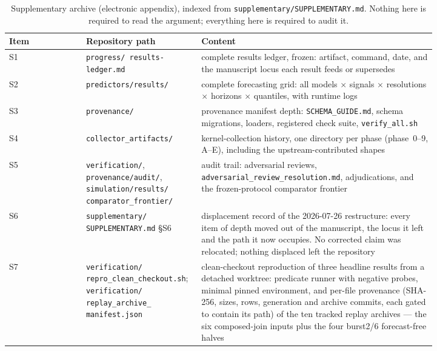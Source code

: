 \begin{table}[htbp]
\centering
\caption[Supplementary archive index]{Supplementary archive (electronic
appendix), indexed from \texttt{supplementary/SUPPLEMENTARY.md}. Nothing here
is required to read the argument; everything here is required to audit it.}
\label{tab:ap-supp}
\scriptsize
\setlength{\tabcolsep}{4pt}
\begin{tabular}{@{}l>{\raggedright\arraybackslash}p{0.27\linewidth}>{\raggedright\arraybackslash}p{0.55\linewidth}@{}}
\toprule
Item & Repository path & Content \\
\midrule
S1 & \texttt{progress/ results-ledger.md} & complete results ledger, frozen: artifact,
  command, date, and the manuscript locus each result feeds or supersedes \\
S2 & \texttt{predictors/results/} & complete forecasting grid: all models
  $\times$ signals $\times$ resolutions $\times$ horizons $\times$ quantiles,
  with runtime logs \\
S3 & \texttt{provenance/} & provenance manifest depth: \texttt{SCHEMA\_GUIDE.md},
  schema migrations, loaders, registered check suite, \texttt{verify\_all.sh} \\
S4 & \texttt{collector\_artifacts/} & kernel-collection history, one directory per
  phase (phase~0--9, A--E), including the upstream-contributed shapes \\
S5 & \texttt{verification/}, \texttt{provenance/audit/},
  \texttt{simulation/results/ comparator\_frontier/} & audit trail: adversarial
  reviews, \texttt{adversarial\_review\_resolution.md}, adjudications, and the
  frozen-protocol comparator frontier \\
S6 & \texttt{supplementary/ SUPPLEMENTARY.md} \S S6 & displacement record of the
  2026-07-26 restructure: every item of depth moved out of the manuscript, the
  locus it left and the path it now occupies. No corrected claim was
  relocated; nothing displaced left the repository \\
S7 & \texttt{verification/ repro\_clean\_checkout.sh};
  \texttt{verification/ replay\_\allowbreak archive\_\allowbreak
  manifest.json} & clean-checkout
  reproduction of three headline results from a detached worktree: predicate
  runner with negative probes, minimal pinned environment, and per-file
  provenance (SHA-256, sizes, rows, generation and archive commits, each
  gated to contain its path) of the ten tracked replay archives --- the six
  composed-join inputs plus the four burst2/6 forecast-free halves \\
\bottomrule
\end{tabular}
\end{table}

